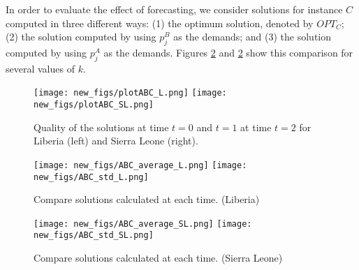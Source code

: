 In order to evaluate the effect of forecasting,
we consider solutions for instance $C$ computed in three different
ways: (1) the optimum solution, denoted by $OPT_C$;
(2) the solution computed by using $p^B_j$ as the demands;
and (3) the solution computed by using $p^A_j$ as the demands.
Figures \ref{fig:ABC_L} and \ref{fig:ABC_L} show this comparison for several values of $k$.



\begin{figure}
    \centering
       \texttt{[image: new\_figs/plotABC\_L.png]}
       \texttt{[image: new\_figs/plotABC\_SL.png]}
    \caption{Quality of the solutions at time $t=0$ and $t=1$ at time $t=2$ for Liberia (left) and Sierra Leone (right). }
\label{fig:ABC_2countries}
\end{figure}

\begin{figure}
    \centering
       \texttt{[image: new\_figs/ABC\_average\_L.png]}
       \texttt{[image: new\_figs/ABC\_std\_L.png]}
    \caption{Compare solutions calculated at each time. (Liberia)}
\label{fig:ABC_L}
\end{figure}

\begin{figure}
    \centering
       \texttt{[image: new\_figs/ABC\_average\_SL.png]}
       \texttt{[image: new\_figs/ABC\_std\_SL.png]}
    \caption{Compare solutions calculated at each time. (Sierra Leone)}
\label{fig:ABC}
\end{figure}

